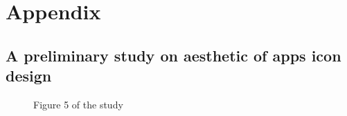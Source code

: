 \documentclass[a4paper,11pt] {article}
\theoremstyle{definition}
\begin{document}
\newpage
\section{Appendix}
    \subsection{A preliminary study on aesthetic of apps icon design\cite{jpAnalitics}}
      \begin{figure}[H]
        \caption{Figure 5 of the study}\label{jpfig5}
      \end{figure}
\end{document}
